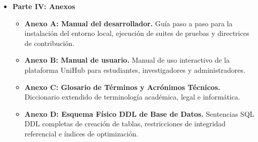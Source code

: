 \begin{itemize}
    \item \textbf{Parte IV: Anexos}
    \begin{itemize}
        \item \textbf{Anexo A: Manual del desarrollador.} Guía paso a paso para la instalación del entorno local, ejecución de suites de pruebas y directrices de contribución.
        \item \textbf{Anexo B: Manual de usuario.} Manual de uso interactivo de la plataforma UniHub para estudiantes, investigadores y administradores.
        \item \textbf{Anexo C: Glosario de Términos y Acrónimos Técnicos.} Diccionario extendido de terminología académica, legal e informática.
        \item \textbf{Anexo D: Esquema Físico DDL de Base de Datos.} Sentencias SQL DDL completas de creación de tablas, restricciones de integridad referencial e índices de optimización.
    \end{itemize}
\end{itemize}
